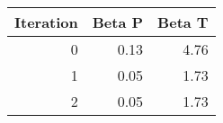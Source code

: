 \begin{tabular}{rrr}
\toprule
 Iteration &  Beta P &  Beta T \\
\midrule
         0 &    0.13 &    4.76 \\
         1 &    0.05 &    1.73 \\
         2 &    0.05 &    1.73 \\
\bottomrule
\end{tabular}
